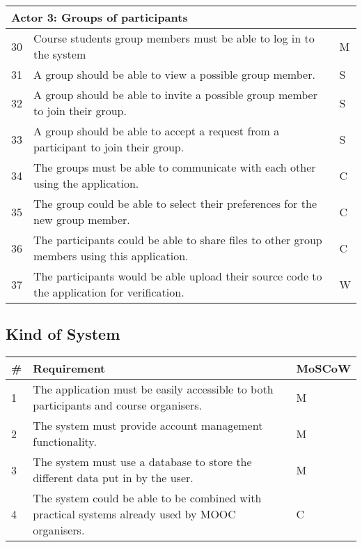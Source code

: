 \begin{tabular}{ | p{0.5cm} | p{12cm} | p{2cm} | }
\hline
\multicolumn{3}{|p{14.5cm}|}{\textbf{Actor 3: Groups of participants}} \\ \hline
30 & Course students group members must be able to log in to the system & M \\ \hline
31 & A group should be able to view a possible group member. & S \\ \hline
32 & A group should be able to invite a possible group member to join their group. & S \\ \hline
33 & A group should be able to accept a request from a participant to join their group. & S \\ \hline
34 & The groups must be able to communicate with each other using the application. & C \\ \hline
35 & The group could be able to select their preferences for the new group member. & C \\ \hline
36 & The participants could be able to share files to other group members using this application. & C \\ \hline
37 & The participants would be able upload their source code to the application for verification. & W \\
\hline
\end{tabular}

\subsection{Kind of System}
\begin{tabular}{ | p{0.5cm} | p{12cm} | p{2cm} | }
\hline
\textbf{\#} & \textbf{Requirement} & \textbf{MoSCoW} \\ \hline
1 & The application must be easily accessible to both participants and course organisers. & M \\ \hline
2 & The system must provide account management functionality. & M \\ \hline
3 & The system must use a database to store the different data put in by the user. & M \\ \hline
4 & The system could be able to be combined with practical systems already used by MOOC organisers. & C \\
\hline
\end{tabular}

